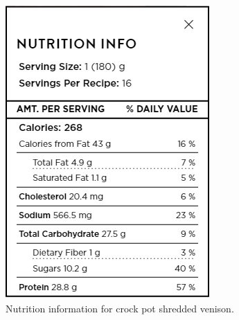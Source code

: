 \begin{figure}[h!]
    \centering
    \includegraphics[width=.25\textwidth]{img/crock-pot-shredded-venison-nutrition.png}
    \caption{Nutrition information for crock pot shredded venison.}
    \label{fig:crock-pot-shredded-venison}
\end{figure}
